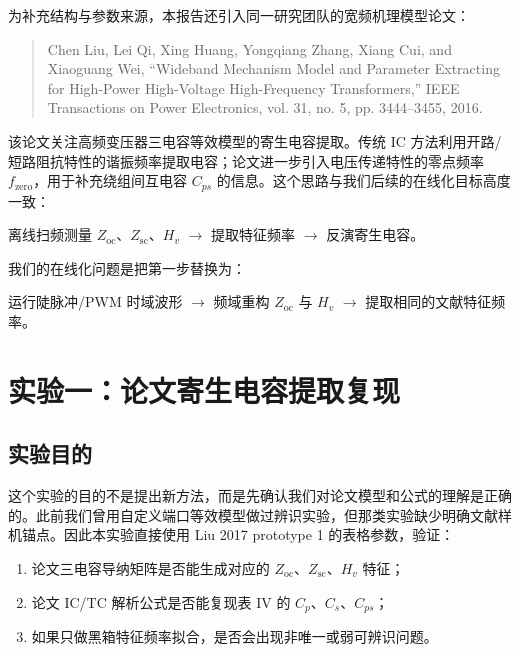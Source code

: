 \documentclass[UTF8,a4paper,12pt]{ctexart}
\begin{document}
为补充结构与参数来源，本报告还引入同一研究团队的宽频机理模型论文：

\begin{quote}
Chen Liu, Lei Qi, Xing Huang, Yongqiang Zhang, Xiang Cui, and Xiaoguang Wei, ``Wideband Mechanism Model and Parameter Extracting for High-Power High-Voltage High-Frequency Transformers,'' IEEE Transactions on Power Electronics, vol. 31, no. 5, pp. 3444--3455, 2016.
\end{quote}

该论文关注高频变压器三电容等效模型的寄生电容提取。传统 IC 方法利用开路/短路阻抗特性的谐振频率提取电容；论文进一步引入电压传递特性的零点频率 $f_{\mathrm{zero}}$，用于补充绕组间互电容 $C_{ps}$ 的信息。这个思路与我们后续的在线化目标高度一致：

\begin{center}
离线扫频测量 $Z_{\mathrm{oc}}$、$Z_{\mathrm{sc}}$、$H_v$
$\rightarrow$
提取特征频率
$\rightarrow$
反演寄生电容。
\end{center}

我们的在线化问题是把第一步替换为：

\begin{center}
运行陡脉冲/PWM 时域波形
$\rightarrow$
频域重构 $Z_{\mathrm{oc}}$ 与 $H_v$
$\rightarrow$
提取相同的文献特征频率。
\end{center}

\section{实验一：论文寄生电容提取复现}

\subsection{实验目的}

这个实验的目的不是提出新方法，而是先确认我们对论文模型和公式的理解是正确的。此前我们曾用自定义端口等效模型做过辨识实验，但那类实验缺少明确文献样机锚点。因此本实验直接使用 Liu 2017 prototype 1 的表格参数，验证：

\begin{enumerate}
  \item 论文三电容导纳矩阵是否能生成对应的 $Z_{\mathrm{oc}}$、$Z_{\mathrm{sc}}$、$H_v$ 特征；
  \item 论文 IC/TC 解析公式是否能复现表 IV 的 $C_p$、$C_s$、$C_{ps}$；
  \item 如果只做黑箱特征频率拟合，是否会出现非唯一或弱可辨识问题。
\end{enumerate}
\end{document}
